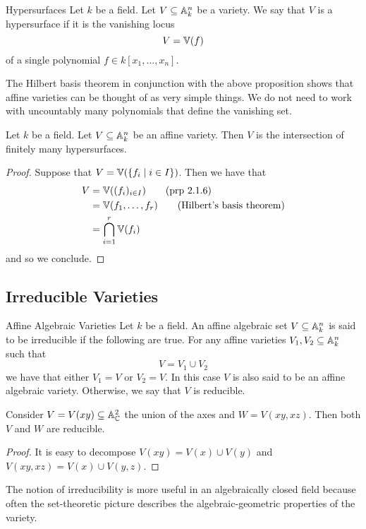 \documentclass[a4paper]{article}
\begin{document}
\begin{defn}{Hypersurfaces}{} Let $k$ be a field. Let $V\subseteq\mathbb{A}_k^n$ be a variety. We say that $V$ is a hypersurface if it is the vanishing locus $$V=\mathbb{V}(f)$$ of a single polynomial $f\in k[x_1,\dots,x_n]$. 
\end{defn}

The Hilbert basis theorem in conjunction with the above proposition shows that affine varieties can be thought of as very simple things. We do not need to work with uncountably many polynomials that define the vanishing set. 

\begin{crl}{}{} Let $k$ be a field. Let $V\subseteq\mathbb{A}_k^n$ be an affine variety. Then $V$ is the intersection of finitely many hypersurfaces. \tcbline
\begin{proof}
Suppose that $V=\mathbb{V}(\{f_i\;|\;i\in I\})$. Then we have that 
\begin{align*}
V&=\mathbb{V}((f_i)_{i\in I})\tag{prp 2.1.6}\\
&=\mathbb{V}(f_1,\dots,f_r)\tag{Hilbert's basis theorem}\\
&=\bigcap_{i=1}^r\mathbb{V}(f_i)
\end{align*}
and so we conclude. 
\end{proof}
\end{crl}

\subsection{Irreducible Varieties}
\begin{defn}{Affine Algebraic Varieties}{} Let $k$ be a field. An affine algebraic set $V\subseteq\mathbb{A}_k^n$ is said to be irreducible if the following are true. For any affine varieties $V_1,V_2\subseteq\mathbb{A}_k^n$ such that $$V=V_1\cup V_2$$ we have that either $V_1=V$ or $V_2=V$. In this case $V$ is also said to be an affine algebraic variety. Otherwise, we say that $V$ is reducible. 
\end{defn}

\begin{eg}{}{} Consider $V=V(xy)\subseteq\mathbb{A}_{\mathbb{C}}^2$ the union of the axes and $W=V(xy,xz)$. Then both $V$ and $W$ are reducible. \tcbline
\begin{proof}
It is easy to decompose $V(xy)=V(x)\cup V(y)$ and $V(xy,xz)=V(x)\cup V(y,z)$. 
\end{proof}
\end{eg}

The notion of irreducibility is more useful in an algebraically closed field because often the set-theoretic picture describes the algebraic-geometric properties of the variety. 
\end{document}

